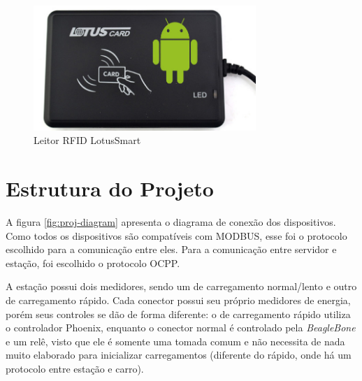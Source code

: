 \begin{figure}[H]
        \begin{center}
                \includegraphics[width=0.75\textwidth,natwidth=655,natheight=368]{assets/images/devices-rfid.jpg}
                \caption{Leitor RFID LotusSmart}
                \label{fig:ihm}
        \end{center}
\end{figure}

\section{Estrutura do Projeto}

A figura \ref{fig:proj-diagram} apresenta o diagrama de conexão dos dispositivos. Como todos os dispositivos são compatíveis com MODBUS, esse foi o protocolo escolhido para a comunicação entre eles. Para a comunicação entre servidor e estação, foi escolhido o protocolo \ac{OCPP}.

A estação possui dois medidores, sendo um de carregamento normal/lento e outro de carregamento rápido. Cada conector possui seu próprio medidores de energia, porém seus controles se dão de forma diferente: o de carregamento rápido utiliza o controlador Phoenix, enquanto o conector normal é controlado pela \textit{BeagleBone} e um relê, visto que ele é somente uma tomada comum e não necessita de nada muito elaborado para inicializar carregamentos (diferente do rápido, onde há um protocolo entre estação e carro).

